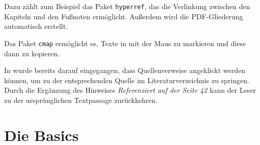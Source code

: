 Dazu zählt zum Beispiel das Paket \verb|hyperref|, das die Verlinkung zwischen den Kapiteln und den Fußnoten ermöglicht.
Außerdem wird die PDF-Gliederung automatisch erstellt.

Das Paket \verb|cmap| ermöglicht es, Texte in mit der Maus zu markieren und diese dann zu kopieren.

In  wurde bereits darauf eingegangen, dass Quellenverweise angeklickt werden können, um zu der entsprechenden Quelle im Literaturverzeichnis zu springen.
Durch die Ergänzung des Hinweises \textit{Referenziert auf der Seite 42} kann der Leser zu der ursprünglichen Textpassage zurückkehren.

\section{Die Basics}\label{sec:basics}

